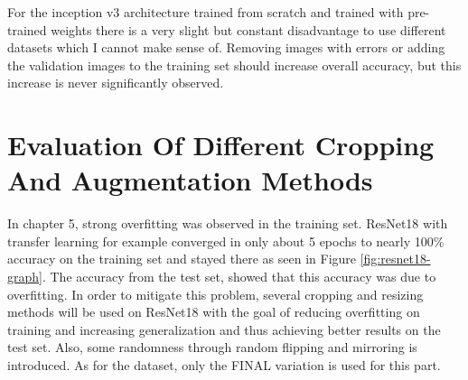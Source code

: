 \begin{table}[h] \centering
{}
\caption{Dataset variations with Inception v3. The first group shows how the datasets performed when trained from scratch whereas the second group shows how the datasets performed with pre-training. FINAL\_C\_B died for the non-pre-trained twice. Only one datapoint used.}
\label{tbl:inceptionv3_dataset}
\end{table}

For the inception v3 architecture trained from scratch and trained with pre-trained weights there is a very slight but constant disadvantage to use different datasets which I cannot make sense of. Removing images  with errors or  adding the validation images to the training set should increase overall accuracy, but this increase is never significantly  observed.












\section{Evaluation Of Different Cropping And Augmentation Methods}

In chapter 5, strong overfitting was observed in the training set. ResNet18 with transfer learning for example converged in only about 5 epochs to nearly 100\% accuracy on the training set and stayed there as seen in Figure \ref{fig:resnet18-graph}. The accuracy from the test set, showed that this accuracy was due to overfitting. In order to mitigate this problem, several cropping and resizing methods will be used on ResNet18 with the goal of reducing overfitting on training  and increasing  generalization and thus achieving better results  on the test set. Also, some randomness through random flipping and mirroring is introduced. As for the dataset, only the FINAL variation is used for this part.

